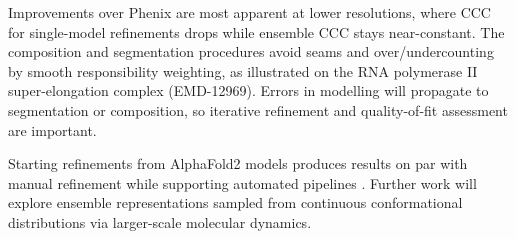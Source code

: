 \documentclass[11pt]{article}
\begin{document}
Improvements over Phenix \citep{r27} are most apparent at lower resolutions, where CCC for single-model refinements drops while ensemble CCC stays near-constant. The composition and segmentation procedures avoid seams and over/undercounting by smooth responsibility weighting, as illustrated on the RNA polymerase II super-elongation complex (EMD-12969). Errors in modelling will propagate to segmentation or composition, so iterative refinement and quality-of-fit assessment are important.

Starting refinements from AlphaFold2 \citep{r41,r42} models produces results on par with manual refinement while supporting automated pipelines \citep{r43,r51}. Further work will explore ensemble representations sampled from continuous conformational distributions via larger-scale molecular dynamics.



\end{document}
